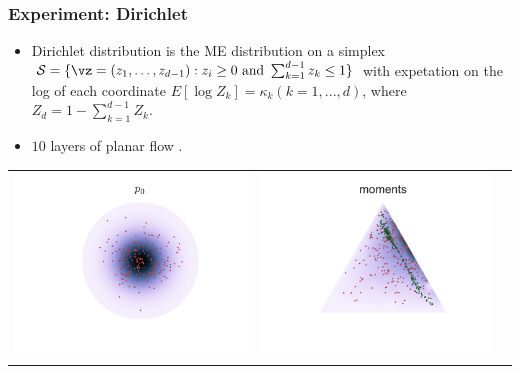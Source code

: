\documentclass[16pt,presentation]{beamer}
\begin{document}
\begin{frame}
\frametitle{Experiment: Dirichlet}
\begin{itemize}
\item Dirichlet distribution is the ME distribution on a simplex $\mathcal{S}=\{\vz = (z_1,\dots,z_{d-1}):z_i\geq 0\text{ and }\sum_{k=1}^{d-1}z_k\leq 1\}$ with expetation on the log of each coordinate $E[\log Z_k] = \kappa_k (k = 1,...,d)$, where $Z_d = 1 - \sum_{k=1}^{d-1} Z_k$.
\item $10$ layers of planar flow \parencite{Rezende2015}.
\end{itemize}
\begin{tabular}[t]{ccc}
\vspace{-0cm}
\includegraphics[scale=0.3,clip = true, trim=1cm 1.5cm 1cm 1.5cm]{figs/MEFN/normal_contours.pdf}&
\includegraphics[scale=0.3,clip = true, trim=1cm 1.5cm 1cm 1.5cm]{figs/MEFN/network_contours_moments.pdf}&

\end{tabular}
\end{frame}
\end{document}

